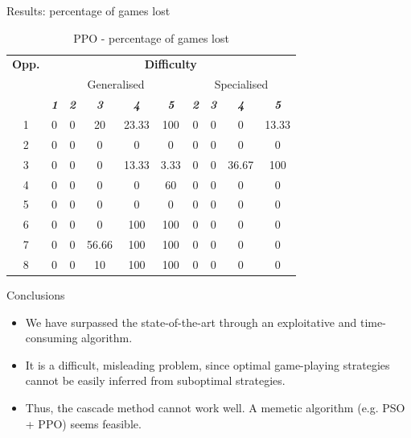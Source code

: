 \documentclass[boxes]{beamer}
\begin{document}
\begin{frame}{Results: percentage of games lost}
      \begin{table}[htbp]
        \caption{PPO - percentage of games lost}
        \begin{center}
            \begin{tabular}{|c|c|c|c|c|c|c|c|c|c|}
                \hline
              \textbf{Opp.}&\multicolumn{9}{|c|}{\textbf{Difficulty}} \\
              \cline{2-10}
                           & \multicolumn{5}{|c|}{Generalised} & \multicolumn{4}{|c|}{Specialised} \\
              \cline{2-10}
                & \textbf{\textit{1}}& \textbf{\textit{2}}& \textbf{\textit{3}} & \textbf{\textit{4}} & \textbf{\textit{5}} & \textbf{\textit{2}}& \textbf{\textit{3}} & \textbf{\textit{4}} & \textbf{\textit{5}}\\
                \hline
                 1 &  0 &  0 &     20 &  23.33 &   100 & 0 & 0 & 0     & 13.33 \\
                 2 &  0 &  0 &      0 &      0 &     0 & 0 & 0 & 0     & 0 \\
                 3 &  0 &  0 &      0 &  13.33 &  3.33 & 0 & 0 & 36.67 & 100 \\
                 4 &  0 &  0 &      0 &      0 &    60 & 0 & 0 & 0     & 0 \\
                 5 &  0 &  0 &      0 &      0 &     0 & 0 & 0 & 0     & 0 \\
                 6 &  0 &  0 &      0 &    100 &   100 & 0 & 0 & 0     & 0 \\
                 7 &  0 &  0 &  56.66 &    100 &   100 & 0 & 0 & 0     & 0 \\
                 8 &  0 &  0 &     10 &    100 &   100 & 0 & 0 & 0     & 0 \\
                \hline
            \end{tabular}
            \label{PPO against all opponents games lost}
        \end{center}
    \end{table}
\end{frame}

\begin{frame}{Conclusions}
  \begin{itemize}
  \item We have surpassed the state-of-the-art through an exploitative and time-consuming algorithm.
  \item It is a difficult, misleading problem, since optimal game-playing strategies cannot be easily inferred from suboptimal strategies.
  \item Thus, the cascade method cannot work well. A memetic algorithm (e.g. PSO + PPO) seems feasible.
  \end{itemize}
\end{frame}
\end{document}
